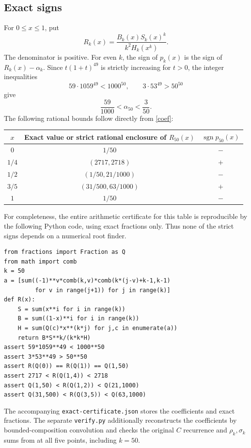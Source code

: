 \documentclass[11pt]{article}
\begin{document}
\subsection*{Exact signs}
For $0\le x\le1$, put
\[
 R_k(x)=\frac{B_k(x)S_k(x)^k}{k^2H_k(x^k)}.
\]
The denominator is positive. For even $k$, the sign of $p_k(x)$ is
the sign of $R_k(x)-\alpha_k$.
Since $t(1+t)^{49}$ is strictly increasing for $t>0$, the integer
inequalities
\[
 59\cdot1059^{49}<1000^{50},\qquad
 3\cdot53^{49}>50^{50}
\]
give
\begin{equation}\label{bracket}
 \frac{59}{1000}<\alpha_{50}<\frac{3}{50}.
\end{equation}
The following rational bounds follow directly from \eqref{coef}:
\begin{center}
\begin{tabular}{ccc}
\toprule
$x$ & Exact value or strict rational enclosure of $R_{50}(x)$
 & $\operatorname{sgn}p_{50}(x)$\\
\midrule
$0$ & $1/50$ & $-$\\
$1/4$ & $(2717,2718)$ & $+$\\
$1/2$ & $(1/50,21/1000)$ & $-$\\
$3/5$ & $(31/500,63/1000)$ & $+$\\
$1$ & $1/50$ & $-$\\
\bottomrule
\end{tabular}
\end{center}
For completeness, the entire arithmetic certificate for this table is
reproducible by the following Python code, using exact fractions only.
Thus none of the strict signs depends on a numerical root finder.
\begin{lstlisting}[basicstyle=\ttfamily\small,frame=single]
from fractions import Fraction as Q
from math import comb
k = 50
a = [sum((-1)**v*comb(k,v)*comb(k*(j-v)+k-1,k-1)
         for v in range(j+1)) for j in range(k)]
def R(x):
    S = sum(x**i for i in range(k))
    B = sum((1-x)**i for i in range(k))
    H = sum(Q(c)*x**(k*j) for j,c in enumerate(a))
    return B*S**k/(k*k*H)
assert 59*1059**49 < 1000**50
assert 3*53**49 > 50**50
assert R(Q(0)) == R(Q(1)) == Q(1,50)
assert 2717 < R(Q(1,4)) < 2718
assert Q(1,50) < R(Q(1,2)) < Q(21,1000)
assert Q(31,500) < R(Q(3,5)) < Q(63,1000)
\end{lstlisting}
The accompanying \texttt{exact-certificate.json} stores the coefficients
and exact fractions. The separate \texttt{verify.py} additionally
reconstructs the coefficients by bounded-composition convolution and
checks the original $C$ recurrence and $\rho_k,\sigma_k$ sums from
\cite{Y} at all five points, including $k=50$.
\end{document}
